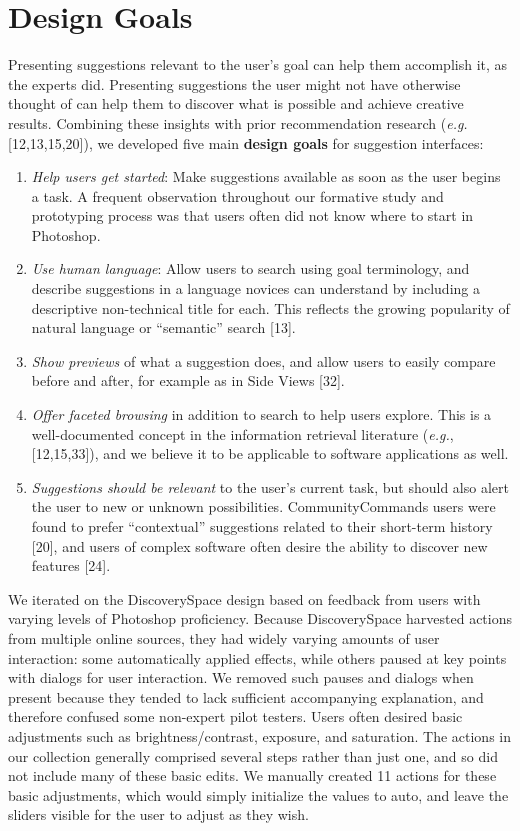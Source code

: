 \section{Design Goals}
Presenting suggestions relevant to the user's goal can help them accomplish it, as the experts did. Presenting suggestions the user might not have otherwise thought of can help them to discover what is possible and achieve creative results. Combining these insights with prior recommendation research (\textit{e.g.} [12,13,15,20]), we developed five main \textbf{design goals} for suggestion interfaces:
\begin{enumerate}
    \item \textit{Help users get started}: Make suggestions available as soon as the user begins a task. A frequent observation throughout our formative study and prototyping process was that users often did not know where to start in Photoshop.
    \item \textit{Use human language}: Allow users to search using goal terminology, and describe suggestions in a language novices can understand by including a descriptive non-technical title for each. This reflects the growing popularity of natural language or ``semantic'' search [13].
    \item \textit{Show previews} of what a suggestion does, and allow users to easily compare before and after, for example as in Side Views [32].
    \item \textit{Offer faceted browsing} in addition to search to help users explore. This is a well-documented concept in the information retrieval literature (\textit{e.g.}, [12,15,33]), and we believe it to be applicable to software applications as well.
    \item \textit{Suggestions should be relevant} to the user's current task, but should also alert the user to new or unknown possibilities. CommunityCommands users were found to prefer ``contextual'' suggestions related to their short-term history [20], and users of complex software often desire the ability to discover new features [24].
\end{enumerate}

We iterated on the Discovery\-Space design based on feedback from users with varying levels of Photoshop proficiency. Because Discovery\-Space harvested actions from multiple online sources, they had widely varying amounts of user interaction: some automatically applied effects, while others paused at key points with dialogs for user interaction. We removed such pauses and dialogs when present because they tended to lack sufficient accompanying explanation, and therefore confused some non-expert pilot testers. Users often desired basic adjustments such as brightness/contrast, exposure, and saturation. The actions in our collection generally comprised several steps rather than just one, and so did not include many of these basic edits. We manually created 11 actions for these basic adjustments, which would simply initialize the values to auto, and leave the sliders visible for the user to adjust as they wish.